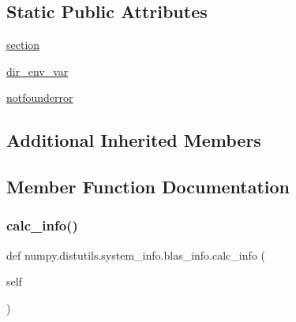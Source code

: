 \subsection*{Static Public Attributes}
\begin{DoxyCompactItemize}
\item 
\hyperlink{classnumpy_1_1distutils_1_1system__info_1_1blas__info_abd72dd7c409bcf19150d5bd6ec796f71}{section}
\item 
\hyperlink{classnumpy_1_1distutils_1_1system__info_1_1blas__info_a0f214a8b756d2ceaa311ef8d9ad6b765}{dir\+\_\+env\+\_\+var}
\item 
\hyperlink{classnumpy_1_1distutils_1_1system__info_1_1blas__info_aaaedd90dec4dfa5ca0518abd47b6d5fa}{notfounderror}
\end{DoxyCompactItemize}
\subsection*{Additional Inherited Members}


\subsection{Member Function Documentation}
\mbox{\label{classnumpy_1_1distutils_1_1system__info_1_1blas__info_accafdaaed8300b2e39300f8296218f69}} 
\subsubsection{\texorpdfstring{calc\+\_\+info()}{calc\_info()}}
{\footnotesize\ttfamily def numpy.\+distutils.\+system\+\_\+info.\+blas\+\_\+info.\+calc\+\_\+info (\begin{DoxyParamCaption}\item[{}]{self }\end{DoxyParamCaption})}

\mbox{\label{classnumpy_1_1distutils_1_1system__info_1_1blas__info_a536a7fd300d4c5f24f45fdfe9a9877b0}} 
